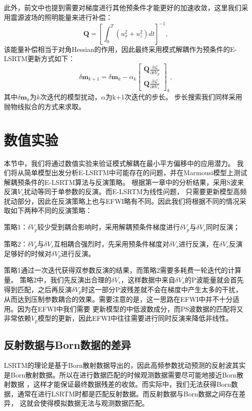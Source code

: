 此外，前文中也提到需要对梯度进行其他预条件才能更好的加速收敛，这里我们采用震源波场的照明能量来进行补偿：
\begin{equation}
	\mathbf{Q} =\left[\int^T_0(u^2_x+u^2_z)dt\right]^{-1},
    \label{eq:Gradient_Illumination_LSRTM}
\end{equation}
该能量补偿相当于对角Hessian的作用，因此最终采用模式解耦作为预条件的E-LSRTM更新方式如下：
\begin{equation}
        \delta\mathbf{m}_{k+1}=\delta\mathbf{m}_{k}-\alpha_k
        \begin{bmatrix}\mathbf{Q}{\frac{\partial\mathcal{L}}{\partial \delta V_p}}\\
		\mathbf{Q}{\frac{\partial\mathcal{L}}{\partial \delta V_s}}\end{bmatrix}_{k},
        \label{eq:Gradientmethod}
\end{equation}
其中$\delta\mathbf{m}_{k}$为$k$次迭代的模型扰动，$\alpha$为k+1次迭代的步长。
步长搜索我们同样采用抛物线拟合的方式来求取。
\section{数值实验}
本节中，我们将通过数值实验来验证模式解耦在最小平方偏移中的应用潜力。
我们将从简单模型出发分析E-LSRTM中可能存在的问题，并在Marmousi模型上测试解耦预条件的E-LSRTM算法与反演策略。
根据第一章中的分析结果，采用S波来反演$V_s$扰动等同于单参数的反演。而E-LSRTM为线性问题，
只需要更新模型高频扰动部分，因此在反演策略上也与EFWI略有不同。因此我们将根据不同的情况采取如下两种不同的反演策略：

策略1：$\delta V_p$较少受到耦合影响时，采用解耦预条件梯度进行$\delta V_p$与$\delta V_s$同时反演；

策略2：$\delta V_p$与$\delta V_s$互相耦合强烈时，先采用预条件梯度对$\delta V_s$进行反演，在$\delta V_s$反演足够好的时候对$\delta V_p$进行反演。

策略1通过一次迭代获得双参数反演的结果，而策略2需要多耗费一轮迭代的计算量。
策略2中，我们先反演出合理的$\delta V_s$，这样数据中来自$\delta
V_s$的P波能量就会首先得到匹配，之后再反演$\delta
V_p$时这一部分P波残差就不会在梯度中产生太多的干扰，从而达到压制参数耦合的效果。需要注意的是，这一思路在EFWI中并不十分适用。因为在EFWI中我们需要
更新模型的中低波数成分，而PS波数据的匹配将又非常依赖$V_p$模型的更新，因此EFWI中往往需要进行同时反演来降低非线性。
\subsection{反射数据与Born数据的差异}
LSRTM的理论是基于Born散射数据导出的，因此高频参数扰动预测的反射波其实是Born散射数据。所以在进行数据匹配的时候观测数据需要尽可能地接近Born散射数据
，这样才能保证最终数据残差的收敛。而实际中，我们无法获得Born数据，通常在进行LSRTM时都是匹配反射数据。而反射数据与Born数据之间存在差异，
这就会使得模拟数据无法与观测数据匹配。

